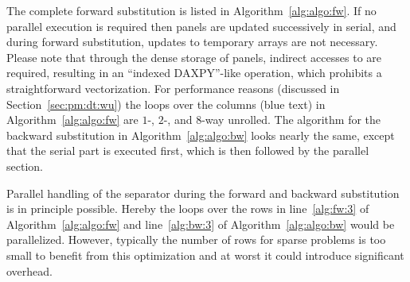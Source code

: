 %
%
%
%
%
%


The complete forward substitution is listed in Algorithm~\ref{alg:algo:fw}.
If no parallel execution is required then panels are updated successively in
serial, and during forward substitution, updates to temporary arrays are not
necessary.
Please note that through the dense storage of panels, indirect accesses to \vr{}
are required, resulting in an ``indexed DAXPY''-like operation, which prohibits a
straightforward vectorization.
For performance reasons (discussed in Section~\ref{sec:pm:dt:wu}) the
loops over the columns (blue text) in Algorithm~\ref{alg:algo:fw} are $1$-,
$2$-, and $8$-way unrolled.
The algorithm for the backward substitution in Algorithm~\ref{alg:algo:bw} 
looks nearly the same, except that
the serial part is executed first, which is then followed by the parallel section.
%

Parallel handling of the separator during the forward and backward
substitution is in principle possible.
Hereby the loops over the rows in line~\ref{alg:fw:3} of Algorithm~\ref{alg:algo:fw}
and line~\ref{alg:bw:3} of Algorithm~\ref{alg:algo:bw} would be parallelized.
However, typically the number of rows for sparse problems is too small to
benefit from this optimization and at worst it could introduce significant
overhead.

